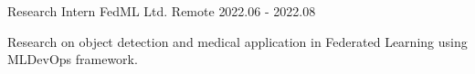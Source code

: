 



\begin{cventries}
\cventry
{Research Intern} %
{FedML Ltd.} %
{Remote} %
{2022.06 - 2022.08} %
{
    \begin{cvitems}
        \item {Research on object detection and medical application in Federated Learning using MLDevOps framework.}
    \end{cvitems}
}
\end{cventries}


